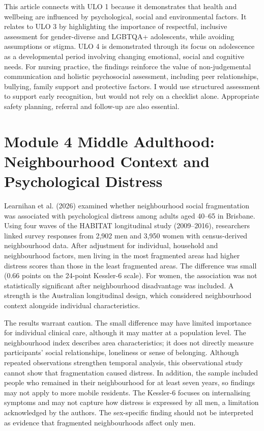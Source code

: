 \documentclass[12pt,a4paper]{article}
\begin{document}
This article connects with ULO 1 because it demonstrates that health and wellbeing are influenced by psychological, social and environmental factors. It relates to ULO 3 by highlighting the importance of respectful, inclusive assessment for gender-diverse and LGBTQA+ adolescents, while avoiding assumptions or stigma. ULO 4 is demonstrated through its focus on adolescence as a developmental period involving changing emotional, social and cognitive needs. For nursing practice, the findings reinforce the value of non-judgemental communication and holistic psychosocial assessment, including peer relationships, bullying, family support and protective factors. I would use structured assessment to support early recognition, but would not rely on a checklist alone. Appropriate safety planning, referral and follow-up are also essential.

\section*{Module 4 Middle Adulthood: Neighbourhood Context and Psychological Distress}

Learnihan et al. (2026) examined whether neighbourhood social fragmentation was associated with psychological distress among adults aged 40--65 in Brisbane. Using four waves of the HABITAT longitudinal study (2009--2016), researchers linked survey responses from 2,902 men and 3,950 women with census-derived neighbourhood data. After adjustment for individual, household and neighbourhood factors, men living in the most fragmented areas had higher distress scores than those in the least fragmented areas. The difference was small (0.66 points on the 24-point Kessler-6 scale). For women, the association was not statistically significant after neighbourhood disadvantage was included. A strength is the Australian longitudinal design, which considered neighbourhood context alongside individual characteristics.

The results warrant caution. The small difference may have limited importance for individual clinical care, although it may matter at a population level. The neighbourhood index describes area characteristics; it does not directly measure participants' social relationships, loneliness or sense of belonging. Although repeated observations strengthen temporal analysis, this observational study cannot show that fragmentation caused distress. In addition, the sample included people who remained in their neighbourhood for at least seven years, so findings may not apply to more mobile residents. The Kessler-6 focuses on internalising symptoms and may not capture how distress is expressed by all men, a limitation acknowledged by the authors. The sex-specific finding should not be interpreted as evidence that fragmented neighbourhoods affect only men.
\end{document}
